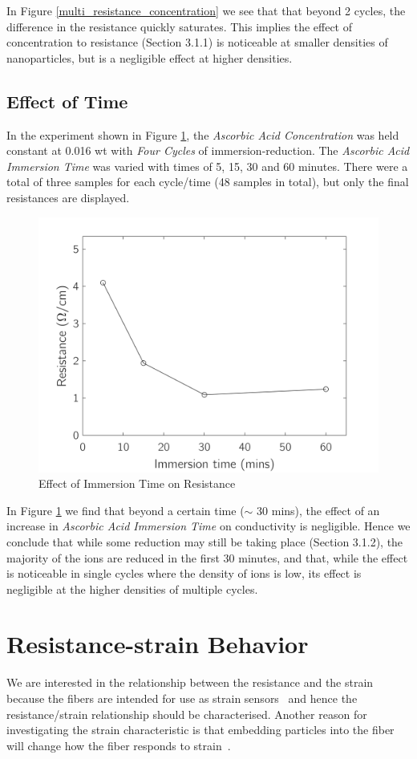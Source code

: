 \documentclass[a4paper, oneside]{discothesis}
\begin{document}
In Figure \ref{multi_resistance_concentration} we see that that beyond 2 cycles, the difference in the resistance quickly saturates. This implies the effect of concentration to resistance (Section 3.1.1) is noticeable at smaller densities of  nanoparticles, but is a negligible effect at higher densities.


\pagebreak
\subsection{Effect of Time}
In the experiment shown in Figure \ref{fig:multi_resistance_time}, the \textit{Ascorbic Acid Concentration} was held constant at 0.016 wt with \textit{Four Cycles} of immersion-reduction. The \textit{Ascorbic Acid Immersion Time} was varied with times of 5, 15, 30 and 60 minutes. There were a total of three samples for each cycle/time (48 samples in total), but only the final resistances are displayed.

\begin{figure}[ht]
    \centering
    \includegraphics[width=0.6\columnwidth]{figures/multi_resistance_time.png}
    \caption{Effect of Immersion Time on Resistance}
    \label{fig:multi_resistance_time}
\end{figure}

In Figure \ref{fig:multi_resistance_time} we find that beyond a certain time ($\sim$ 30 mins), the effect of an increase in \textit{Ascorbic Acid Immersion Time} on conductivity is negligible. Hence we conclude that while some reduction may still be taking place (Section 3.1.2), the majority of the  ions are reduced in the first 30 minutes, and that, while the effect is noticeable in single cycles where the density of  ions is low, its effect is negligible at the higher densities of multiple cycles.

\section{Resistance-strain Behavior}
We are interested in the relationship between the resistance and the strain because the fibers are intended for use as strain sensors~\cite{jae2018} and hence the resistance/strain relationship should be characterised. Another reason for investigating the strain characteristic is that embedding  particles into the fiber will change how the fiber responds to strain~\cite{cond_shell}.
\end{document}
